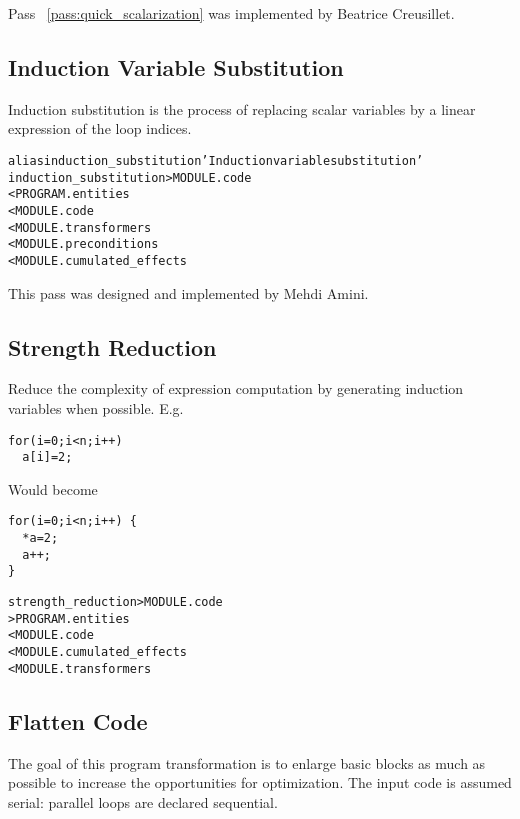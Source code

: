 \documentclass[a4paper]{report}
\newenvironment{PipsMake}{\begin{alltt}}{\end{alltt}}
\newcommand{\PipsPassRef}[1]{\texttt{\detokenize{#1}}~\ref{pass:#1}}
\newenvironment{PipsPass}[1]{\label{pass:#1}}{}
\begin{document}
Pass \PipsPassRef{quick_scalarization} was implemented by Beatrice Creusillet.

\subsection{Induction Variable Substitution}

\begin{PipsPass}{induction_substitution}
Induction substitution is the process of replacing scalar variables
by a linear expression of the loop indices.
\end{PipsPass}


\begin{PipsMake}
alias induction_substitution 'Induction variable substitution'
induction_substitution > MODULE.code
        < PROGRAM.entities
        < MODULE.code
        < MODULE.transformers
        < MODULE.preconditions
        < MODULE.cumulated_effects
\end{PipsMake}

This pass was designed and implemented by Mehdi Amini.

\subsection{Strength Reduction}

\begin{PipsPass}{strength_reduction}
Reduce the complexity of expression computation by generating
induction variables when possible.
\end{PipsPass}
E.g.
\begin{lstlisting}
for(i=0;i<n;i++)
  a[i]=2;
\end{lstlisting}
Would become
\begin{lstlisting}
for(i=0;i<n;i++) {
  *a=2;
  a++;
}
\end{lstlisting}
\begin{PipsMake}
strength_reduction > MODULE.code
                   > PROGRAM.entities
    < MODULE.code
    < MODULE.cumulated_effects
    < MODULE.transformers
\end{PipsMake}


\subsection{Flatten Code}

\begin{PipsPass}{flatten_code}
The goal of this program transformation is to enlarge basic blocks as
much as possible to increase the opportunities for optimization. The
input code is assumed serial: parallel loops are declared sequential.
\end{PipsPass}
\end{document}
